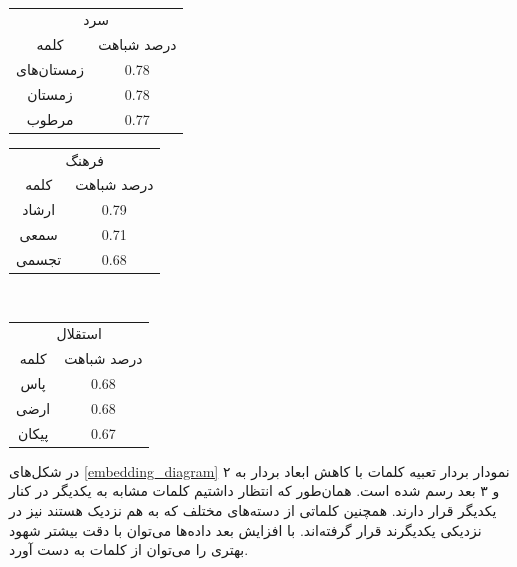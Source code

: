 \documentclass[12pt, a4paper]{article}
\begin{document}
\begin{table}[h]
    \\[10   pt]
    \smallskip
    \hfil
    \begin{tabular}{c|c}
        \multicolumn{2}{c}{\cellcolor{blue!25}سرد} \\[5pt]
        کلمه & درصد شباهت \\ \hline
        زمستان‌های & 0.78 \\
        زمستان & 0.78 \\
        مرطوب & 0.77
    \end{tabular}
    \hfil
    \begin{tabular}{c|c}
        \multicolumn{2}{c}{\cellcolor{blue!25}فرهنگ} \\[5pt]
        کلمه & درصد شباهت \\ \hline
        ارشاد & 0.79 \\
        سمعی & 0.71 \\
        تجسمی & 0.68
    \end{tabular}
    \\[10   pt]
    \smallskip
    \hfil
    \begin{tabular}{c|c}
        \multicolumn{2}{c}{\cellcolor{blue!25}استقلال} \\[5pt]
        کلمه & درصد شباهت \\ \hline
        پاس & 0.68 \\
        ارضی & 0.68 \\
        پیکان & 0.67
    \end{tabular}
    \hfil
\end{table}

در شکل‌های \ref{embedding_diagram} نمودار بردار تعبیه کلمات با کاهش ابعاد بردار به ۲ و ۳ بعد رسم شده است.
همان‌طور که انتظار داشتیم کلمات مشابه به یکدیگر در کنار یکدیگر قرار دارند. همچنین کلماتی از دسته‌های مختلف
که به هم نزدیک هستند نیز در نزدیکی یکدیگرند قرار گرفته‌اند. با افزایش بعد داده‌ها می‌توان با دقت
بیشتر شهود بهتری را می‌توان از کلمات به دست آورد.
\end{document}

